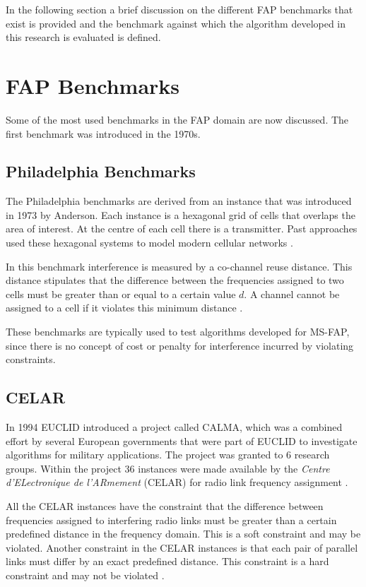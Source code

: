 In the following section a brief discussion on the different \gls{FAP} benchmarks that exist is provided and the benchmark against which the algorithm developed in this research is evaluated is defined.
\section{FAP Benchmarks}
\label{sec:FAPBenchmarks}
Some of the most used benchmarks in the \gls{FAP} domain are now discussed. The first benchmark was introduced in the 1970s.
\subsection{Philadelphia Benchmarks}
The Philadelphia benchmarks are derived from an instance that was introduced in 1973 by Anderson\cite{AndersonPhiladelphia}. Each instance is a hexagonal grid of cells that overlaps the area of interest. At the centre of each cell there is a transmitter. Past approaches used these hexagonal systems to model modern cellular networks \cite{Karen2004,ExactMIFAP}.

In this benchmark interference is measured by a co-channel reuse distance\cite{Karen2004}. This distance stipulates that the difference between the frequencies  assigned to two cells must be greater than or equal to a certain value $d$. A channel cannot be assigned to a cell if it violates this minimum distance \cite{ExactMIFAP}.

These benchmarks are typically used to test algorithms developed for \gls{MS-FAP}, since there is no concept of cost or penalty for interference incurred by violating constraints.
\subsection{CELAR}
In 1994 \gls{EUCLID} introduced a project called CALMA, which was a combined effort by several European governments that were part of \gls{EUCLID} to investigate algorithms for military applications\cite{Karen2004}. The project was granted to 6 research groups. Within the project 36 instances were made available by the \emph{Centre d'ELectronique de l'ARmement} (CELAR) for radio link frequency assignment \cite{Karen2004,DynamicFAP}.

All the CELAR instances have the constraint that the difference between frequencies assigned to interfering radio links must be greater than a certain predefined distance in the frequency domain\cite{Karen2004}. This is a soft constraint and may be violated. Another constraint in the CELAR instances is that each pair of parallel links must differ by an exact predefined distance\cite{Karen2004}. This constraint is a hard constraint and may not be violated \cite{DynamicFAP}.


